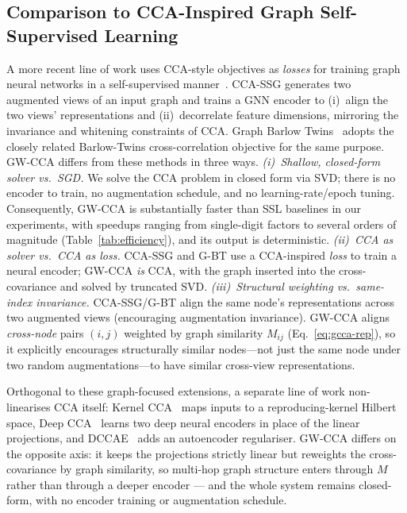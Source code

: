 \documentclass{article}
\begin{document}
\subsection{Comparison to CCA-Inspired Graph Self-Supervised Learning}
\label{sec:approach:ssl}
A more recent line of work uses CCA-style objectives as \emph{losses} for
training graph neural networks in a self-supervised
manner~\citep{zhang2021ccassg,bielak2022graphbt}. CCA-SSG
\citep{zhang2021ccassg} generates two augmented views of an input graph and
trains a GNN encoder to (i)~align the two views' representations and
(ii)~decorrelate feature dimensions, mirroring the invariance and whitening
constraints of CCA. Graph Barlow Twins~\citep{bielak2022graphbt} adopts the
closely related Barlow-Twins cross-correlation objective for the same
purpose. GW-CCA differs from these methods in three ways.
\emph{(i)~Shallow, closed-form solver vs.\ SGD.} We solve the CCA
problem in closed form via SVD; there is no encoder to train,
no augmentation schedule, and no learning-rate/epoch tuning. Consequently,
GW-CCA is substantially faster than SSL baselines in our experiments,
with speedups ranging from single-digit factors to several orders of
magnitude (Table~\ref{tab:efficiency}), and its output is deterministic.
\emph{(ii)~CCA as solver vs.\ CCA as loss.} CCA-SSG and G-BT use a
CCA-inspired \emph{loss} to train a neural encoder; GW-CCA \emph{is} CCA,
with the graph inserted into the cross-covariance and solved by
truncated SVD. \emph{(iii)~Structural weighting vs.\ same-index
invariance.} CCA-SSG/G-BT align the same node's representations across two
augmented views (encouraging augmentation invariance). GW-CCA aligns
\emph{cross-node} pairs $(i,j)$ weighted by graph similarity $M_{ij}$
(Eq.~\ref{eq:gcca-rep}), so it explicitly encourages structurally similar
nodes---not just the same node under two random augmentations---to have
similar cross-view representations.

Orthogonal to these graph-focused extensions, a separate line of work
non-linearises CCA itself: Kernel CCA~\citep{hardoon2004canonical} maps
inputs to a reproducing-kernel Hilbert space, Deep
CCA~\citep{andrew2013deep} learns two deep neural encoders in place of the
linear projections, and DCCAE~\citep{wang2015deep} adds an autoencoder
regulariser. GW-CCA differs on the opposite axis: it keeps the projections
strictly linear but reweights the cross-covariance by graph similarity, so
multi-hop graph structure enters through $M$ rather than through a deeper
encoder --- and the whole system remains closed-form, with no encoder
training or augmentation schedule.
\end{document}
